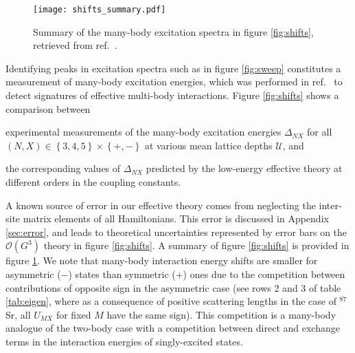 \documentclass[preprint,showkeys,nofootinbib]{revtex4-1}
\newcommand{\p}[1]{\left(#1\right)} %
\renewcommand{\set}[1]{\left\{#1\right\}} %
\renewcommand{\O}{\mathcal{O}}
\newcommand{\U}{\mathcal{U}}
\newcommand{\1}{\mathds{1}}
\begin{document}
\begin{figure}
  \centering
  \texttt{[image: shifts\_summary.pdf]}
  \caption{\footnotesize Summary of the many-body excitation spectra
    in figure \ref{fig:shifts}, retrieved from
    ref.~\cite{goban2018emergence}.}
  \label{fig:shifts_summary}
\end{figure}

Identifying peaks in excitation spectra such as in figure
\ref{fig:sweep} constitutes a measurement of many-body excitation
energies, which was performed in ref.~\cite{goban2018emergence} to
detect signatures of effective multi-body interactions.  Figure
\ref{fig:shifts} shows a comparison between
\begin{enumerate*}
\item experimental measurements of the many-body excitation energies
  $\Delta_{NX}$ for all $\p{N,X}\in\set{3,4,5}\times\set{+,-}$ at
  various mean lattice depths $\U$, and
\item the corresponding values of $\Delta_{NX}$ predicted by the
  low-energy effective theory at different orders in the coupling
  constants.
\end{enumerate*}
A known source of error in our effective theory comes from neglecting
the inter-site matrix elements of all Hamiltonians.  This error is
discussed in Appendix \ref{sec:error}, and leads to theoretical
uncertainties represented by error bars on the $\O\p{G^3}$ theory in
figure \ref{fig:shifts}.  A summary of figure \ref{fig:shifts} is
provided in figure \ref{fig:shifts_summary}.  We note that many-body
interaction energy shifts are smaller for asymmetric ($-$) states than
symmetric ($+$) ones due to the competition between contributions of
opposite sign in the asymmetric case (see rows 2 and 3 of table
\ref{tab:eigen}, where as a consequence of positive scattering lengths
in the case of $^{87}$Sr, all $U_{MX}$ for fixed $M$ have the same
sign).  This competition is a many-body analogue of the two-body case
with a competition between direct and exchange terms in the
interaction energies of singly-excited states.
\end{document}
